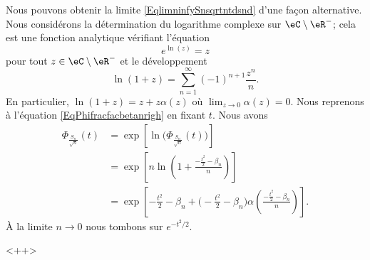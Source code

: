 \begin{remark}
    Nous pouvons obtenir la limite \eqref{EqlimninfySnsqrtntdsnd} d'une façon alternative. Nous considérons la détermination du logarithme complexe sur \( \eC\setminus\eR^-\); cela est une fonction analytique vérifiant l'équation
    \begin{equation}
        e^{\ln(z)}=z
    \end{equation}
    pour tout \( z\in\eC\setminus\eR^-\) et le développement
    \begin{equation}
        \ln(1+z)=\sum_{n=1}^{\infty}(-1)^{n+1}\frac{ z^n }{ n }.
    \end{equation}
    En particulier, \( \ln(1+z)=z+z\alpha(z)\) où \( \lim_{z\to 0}\alpha(z)=0\). Nous reprenons à l'équation \eqref{EqPhifracfacbetanrigh} en fixant \( t\). Nous avons
    \begin{subequations}
        \begin{align}
            \Phi_{\frac{ S_n }{ \sqrt{n} }}(t)&=\exp\left[ \ln\big(\Phi_{\frac{ S_n }{ \sqrt{n} }}(t)\big) \right]\\
            &=\exp\left[ n\ln\left( 1+\frac{ -\frac{ t^2 }{2}-\beta_n }{ n } \right) \right]\\
            &=\exp\left[ -\frac{ t^2 }{2}-\beta_n+ \big( -\frac{ t^2 }{2}-\beta_n \big)\alpha\left( \frac{ -\frac{ t^2 }{2}-\beta_n }{ n } \right) \right].
        \end{align}
    \end{subequations}
    À la limite \( n\to 0\) nous tombons sur \(  e^{-t^2/2}\).
    
\end{remark}
<++>
